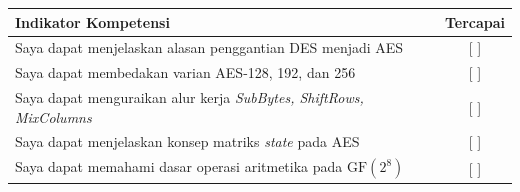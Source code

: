 \documentclass[../main.tex]{subfiles}
\begin{document}
\begin{competencychecklist}
\begin{tabularx}{\linewidth}{|X|c|}
\hline
Indikator Kompetensi & Tercapai \\
\hline
Saya dapat menjelaskan alasan penggantian DES menjadi AES & [ ] \\
\hline
Saya dapat membedakan varian AES-128, 192, dan 256 & [ ] \\
\hline
Saya dapat menguraikan alur kerja \textit{SubBytes, ShiftRows, MixColumns} & [ ] \\
\hline
Saya dapat menjelaskan konsep matriks \textit{state} pada AES & [ ] \\
\hline
Saya dapat memahami dasar operasi aritmetika pada $\text{GF}(2^8)$ & [ ] \\
\hline
\end{tabularx}
\end{competencychecklist}
\end{document}
